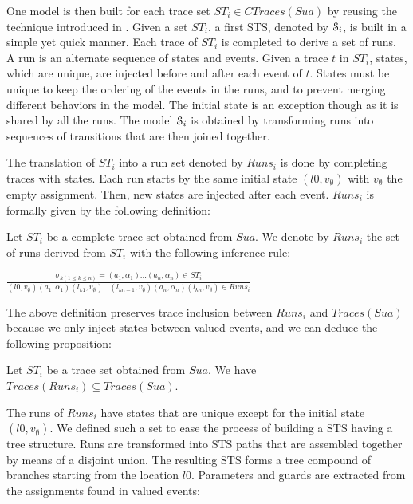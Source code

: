 One model is then built for each trace set $ST_i \in
CTraces(Sua)$ by reusing the technique introduced in
. Given a set
$ST_i$, a first STS, denoted by $\EuScript{S}_i$, is built in a
simple yet quick manner. Each trace of $ST_i$ is completed to
derive a set of runs. A run is an alternate sequence of states
and events. Given a trace $t$ in $ST_i$, states, which are
unique, are injected before and after each event of $t$. States
must be unique to keep the ordering of the events in the runs,
and to prevent merging different behaviors in the model.  The
initial state is an exception though as it is shared by all the
runs. The model $\EuScript{S}_i$ is obtained by transforming runs
into sequences of transitions that are then joined together.

The translation of $ST_i$ into a run set denoted by $Runs_i$ is done
by completing traces with states. Each run starts by the same
initial state $(l0,v_\emptyset)$ with $v_\emptyset$ the empty
assignment. Then, new states are injected after each event.
$Runs_i$ is formally given by the following definition:

\begin{definition}
  Let $ST_i$ be a complete trace set obtained from
  $\mathit{Sua}$. We denote by $Runs_i$ the set of runs derived from
  $ST_i$ with the following inference rule:

  \begin{center}
    {\Large
    $\frac{\sigma_{k(1\leq k \leq n)}=(a_1,\alpha_1)...(a_n,\alpha_n) \in ST_i}
    {(l0,v_\emptyset) (a_1,\alpha_1) (l_{k1},v_\emptyset) \dots (l_{kn-1},v_\emptyset) (a_n,\alpha_n) (l_{kn},v_\emptyset) \in Runs_i}$
    }
  \end{center}
\end{definition}

The above definition preserves trace inclusion \cite{petrenko06}
between $Runs_i$ and $Traces(Sua)$ because we only inject states
between valued events, and we can deduce the following
proposition:

\begin{proposition}
Let $ST_i$ be a trace set obtained from $\mathit{Sua}$. We have
$Traces(Runs_i) \subseteq Traces(Sua)$.
\end{proposition}

The runs of $Runs_i$ have states that are unique except for the
initial state $(l0,v_\emptyset)$. We defined such a set to
ease the process of building a STS having a tree structure.  Runs
are transformed into STS paths that are assembled together by
means of a disjoint union. The resulting STS forms a tree
compound of branches starting from the location $l0$. Parameters
and guards are extracted from the assignments found in valued
events:

